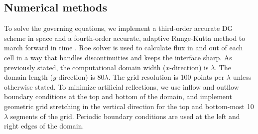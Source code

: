 \subsection{Numerical methods}%
\label{subsec:numerical_methods}%
To solve the governing equations, we implement a third-order accurate
\ac{DG} scheme in space and a fourth-order accurate, adaptive
Runge-Kutta method to march forward in time
\citep{HenrydeFrahan2015}. Roe solver is used to calculate flux in and
out of each cell in a way that handles discontinuities and keeps the
interface sharp. As previously stated, the computational domain width
($x$-direction) is $\lambda$. The domain length ($y$-direction) is
80$\lambda$. The grid resolution is 100 points per $\lambda$ unless
otherwise stated. To minimize artificial reflections, we use inflow
and outflow boundary conditions at the top and bottom of the domain,
and implement geometric grid stretching in the vertical direction for
the top and bottom-most 10$\lambda$ segments of the grid. Periodic
boundary conditions are used at the left and right edges of the
domain.


